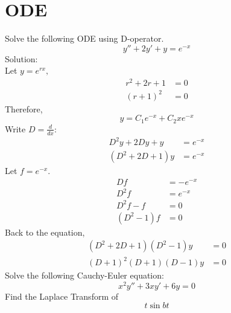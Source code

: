 \documentclass{exam}
\begin{document}
\section{ODE}
\begin{questions}
\question Solve the following ODE using D-operator. 
\begin{equation*}
	y''+2y'+y=e^{-x}
\end{equation*}
Solution:\\
Let $y = e^{rx},$\\
\begin{align*}
	r^2+2r+1&=0\\
	(r+1)^2&=0
\end{align*}
Therefore,
\begin{equation*}
	y = C_1e^{-x}+C_2xe^{-x}
\end{equation*}
Write $D = \frac{d}{dx}$:
\begin{align*}
	D^2y+2Dy+y &=e^{-x} \\
	(D^2+2D+1)y &= e^{-x} 
\end{align*}
Let $f = e^{-x}$.
\begin{align*}
	Df &= -e^{-x} \\
	D^2f &= e^{-x} \\
	D^2f - f &= 0 \\
	(D^2 - 1)f &= 0
\end{align*}
Back to the equation,
\begin{align*}
	(D^2+2D+1)(D^2-1)y &= 0 \\
	(D+1)^2(D+1)(D-1)y &= 0
\end{align*}
\question Solve the following Cauchy-Euler equation:
\begin{equation*}
	x^2y''+3xy'+6y=0
\end{equation*}
\question Find the Laplace Transform of
\begin{equation*}
	t\sin bt
\end{equation*}
\end{questions}
\end{document}
